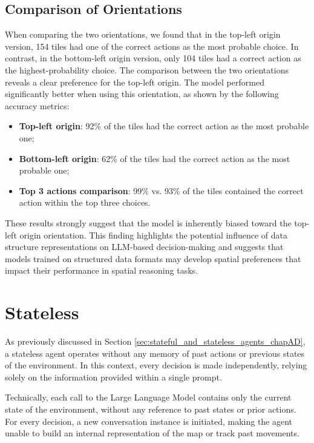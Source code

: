 \vspace{5mm}

\subsection{Comparison of Orientations}

When comparing the two orientations, we found that in the top-left origin version,
154 tiles had one of the correct actions as the most probable choice. In contrast,
in the bottom-left origin version, only 104 tiles had a correct action as the highest-probability
choice. The comparison between the two orientations reveals a clear preference
for the top-left origin. The model performed significantly better when using this
orientation, as shown by the following accuracy metrics:
\begin{itemize}
  \item \textbf{Top-left origin}: 92\% of the tiles had the correct action as
    the most probable one;

  \item \textbf{Bottom-left origin}: 62\% of the tiles had the correct action as
    the most probable one;

  \item \textbf{Top 3 actions comparison}: 99\% vs. 93\% of the tiles contained
    the correct action within the top three choices.
\end{itemize}

These results strongly suggest that the model is inherently biased toward the
top-left origin orientation. This finding highlights the potential influence of data
structure representations on LLM-based decision-making and suggests that models trained
on structured data formats may develop spatial preferences that impact their performance
in spatial reasoning tasks.

\section{Stateless}
\label{sec:stateless}

As previously discussed in Section
\ref{sec:stateful_and_stateless_agents_chapAD}, a stateless agent operates without
any memory of past actions or previous states of the environment. In this
context, every decision is made independently, relying solely on the information
provided within a single prompt.

Technically, each call to the Large Language Model contains only the current state
of the environment, without any reference to past states or prior actions. For every
decision, a new conversation instance is initiated, making the agent unable to build
an internal representation of the map or track past movements.

